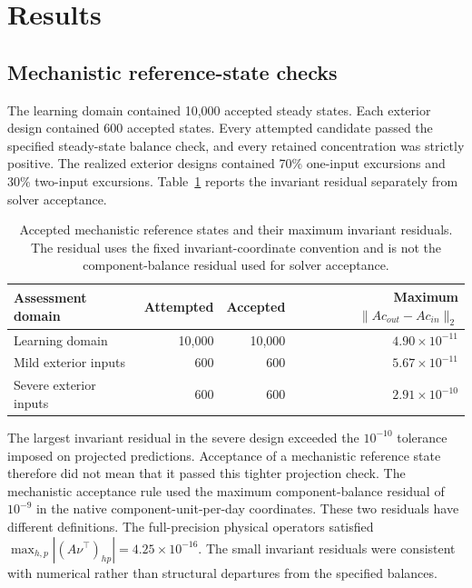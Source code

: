 \section{Results}
\label{sec:projection_results}

\subsection{Mechanistic reference-state checks}

The learning domain contained 10,000 accepted steady states. Each exterior design contained 600 accepted states. Every attempted candidate passed the specified steady-state balance check, and every retained concentration was strictly positive. The realized exterior designs contained 70\% one-input excursions and 30\% two-input excursions. Table~\ref{tab:projection_dataset_results} reports the invariant residual separately from solver acceptance.

\begin{table}[htbp]
\centering\small
\caption{Accepted mechanistic reference states and their maximum invariant residuals. The residual uses the fixed invariant-coordinate convention and is not the component-balance residual used for solver acceptance.}
\label{tab:projection_dataset_results}
\begin{tabular}{lrrr}
\toprule
Assessment domain & Attempted & Accepted & Maximum $\|Ac_{out}-Ac_{in}\|_2$\\
\midrule
Learning domain & 10,000 & 10,000 & $4.90\times10^{-11}$\\
Mild exterior inputs & 600 & 600 & $5.67\times10^{-11}$\\
Severe exterior inputs & 600 & 600 & $2.91\times10^{-10}$\\
\bottomrule
\end{tabular}
\end{table}

The largest invariant residual in the severe design exceeded the $10^{-10}$ tolerance imposed on projected predictions. Acceptance of a mechanistic reference state therefore did not mean that it passed this tighter projection check. The mechanistic acceptance rule used the maximum component-balance residual of $10^{-9}$ in the native component-unit-per-day coordinates. These two residuals have different definitions. The full-precision physical operators satisfied $\max_{h,p}|(A\nu^\top)_{hp}|=4.25\times10^{-16}$. The small invariant residuals were consistent with numerical rather than structural departures from the specified balances.

